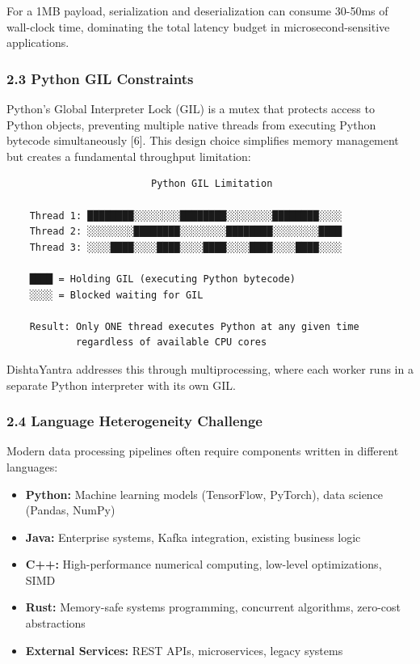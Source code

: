 \documentclass[
]{article}
\providecommand{\tightlist}{%
  \setlength{\itemsep}{0pt}\setlength{\parskip}{0pt}}
\begin{document}
For a 1MB payload, serialization and deserialization can consume 30-50ms
of wall-clock time, dominating the total latency budget in
microsecond-sensitive applications.

\hypertarget{python-gil-constraints}{%
\subsubsection{2.3 Python GIL
Constraints}\label{python-gil-constraints}}

Python's Global Interpreter Lock (GIL) is a mutex that protects access
to Python objects, preventing multiple native threads from executing
Python bytecode simultaneously {[}6{]}. This design choice simplifies
memory management but creates a fundamental throughput limitation:

\begin{verbatim}
                         Python GIL Limitation
    
    Thread 1: ████████░░░░░░░░████████░░░░░░░░████████░░░░
    Thread 2: ░░░░░░░░████████░░░░░░░░████████░░░░░░░░████
    Thread 3: ░░░░████░░░░████░░░░████░░░░████░░░░████░░░░
    
    ████ = Holding GIL (executing Python bytecode)
    ░░░░ = Blocked waiting for GIL
    
    Result: Only ONE thread executes Python at any given time
            regardless of available CPU cores
\end{verbatim}

DishtaYantra addresses this through multiprocessing, where each worker
runs in a separate Python interpreter with its own GIL.

\hypertarget{language-heterogeneity-challenge}{%
\subsubsection{2.4 Language Heterogeneity
Challenge}\label{language-heterogeneity-challenge}}

Modern data processing pipelines often require components written in
different languages:

\begin{itemize}
\tightlist
\item
  \textbf{Python:} Machine learning models (TensorFlow, PyTorch), data
  science (Pandas, NumPy)
\item
  \textbf{Java:} Enterprise systems, Kafka integration, existing
  business logic
\item
  \textbf{C++:} High-performance numerical computing, low-level
  optimizations, SIMD
\item
  \textbf{Rust:} Memory-safe systems programming, concurrent algorithms,
  zero-cost abstractions
\item
  \textbf{External Services:} REST APIs, microservices, legacy systems
\end{itemize}
\end{document}

